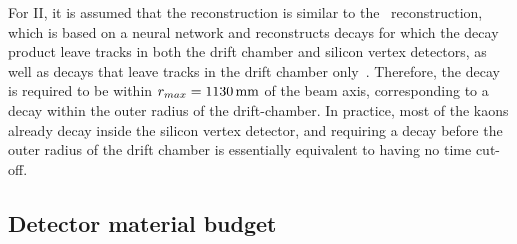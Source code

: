 
For \belle II, it is assumed that the \KS reconstruction is similar to {}the \belle\ \KS reconstruction, which is based on a neural network and reconstructs \KS decays for which the decay product leave tracks in both the drift chamber and silicon vertex detectors, as well as decays that leave tracks in the drift chamber only~\cite{BelleKSPaper,BelleKSThesis}. Therefore, the \KS decay is required to be within $r_{max}=1130\text{\,mm}$ of the beam axis, corresponding to a decay within the outer radius of the drift-chamber. In practice, most of the kaons already decay inside the silicon vertex detector, and requiring a decay before the outer radius of the drift chamber is essentially equivalent to having no time cut-off.




\subsection{Detector material budget} %
\label{sub:detector_material_budget}

